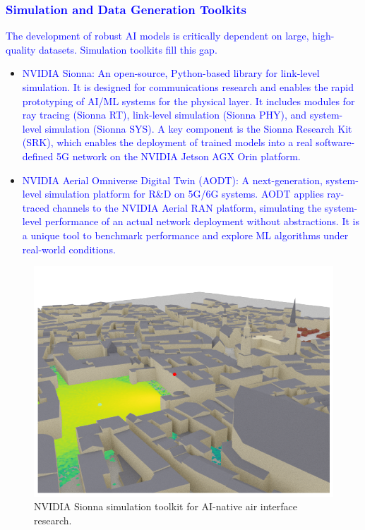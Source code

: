 \documentclass[conference]{IEEEtran}
\begin{document}
\textcolor{blue}{\subsubsection{Simulation and Data Generation Toolkits}
The development of robust AI models is critically dependent on large, high-quality datasets. Simulation toolkits fill this gap.}

\begin{itemize}
\item \textcolor{blue}{NVIDIA Sionna: An open-source, Python-based library for link-level simulation. It is designed for communications research and enables the rapid prototyping of AI/ML systems for the physical layer. It includes modules for ray tracing (Sionna RT), link-level simulation (Sionna PHY), and system-level simulation (Sionna SYS). A key component is the Sionna Research Kit (SRK), which enables the deployment of trained models into a real software-defined 5G network on the NVIDIA Jetson AGX Orin platform.}

\item \textcolor{blue}{NVIDIA Aerial Omniverse Digital Twin (AODT): A next-generation, system-level simulation platform for R\&D on 5G/6G systems. AODT applies ray-traced channels to the NVIDIA Aerial RAN platform, simulating the system-level performance of an actual network deployment without abstractions. It is a unique tool to benchmark performance and explore ML algorithms under real-world conditions.}
\end{itemize}

\begin{figure}[htbp]
\centerline{\includegraphics[width=0.9\columnwidth]{images/nvidia_sionna_simulation.png}}
\caption{NVIDIA Sionna simulation toolkit for AI-native air interface research.}
\label{fig:nvidia_sionna_simulation}
\end{figure}
\end{document}
